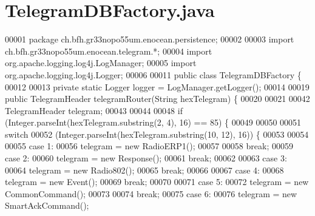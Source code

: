 \section{Telegram\+D\+B\+Factory.\+java}
\label{TelegramDBFactory_8java_source}

\begin{DoxyCode}
00001 \textcolor{keyword}{package }ch.bfh.gr33nopo55um.enocean.persistence;
00002 
00003 \textcolor{keyword}{import} ch.bfh.gr33nopo55um.enocean.telegram.*;
00004 \textcolor{keyword}{import} org.apache.logging.log4j.LogManager;
00005 \textcolor{keyword}{import} org.apache.logging.log4j.Logger;
00006 
00011 \textcolor{keyword}{public} \textcolor{keyword}{class }TelegramDBFactory \{
00012 
00013     \textcolor{keyword}{private} \textcolor{keyword}{static} Logger logger = LogManager.getLogger();
00014 
00019     \textcolor{keyword}{public} TelegramHeader telegramRouter(String hexTelegram) \{
00020 
00021 
00042         TelegramHeader telegram;
00043 
00044 
00048         \textcolor{keywordflow}{if} (Integer.parseInt(hexTelegram.substring(2, 4), 16) == 85) \{
00049 
00050 
00051             \textcolor{keywordflow}{switch}
00052                     (Integer.parseInt(hexTelegram.substring(10, 12), 16)) \{
00053 
00054 
00055                 \textcolor{keywordflow}{case} 1:
00056                     telegram = \textcolor{keyword}{new} RadioERP1();
00057 
00058                     \textcolor{keywordflow}{break};
00059                 \textcolor{keywordflow}{case} 2:
00060                     telegram = \textcolor{keyword}{new} Response();
00061                     \textcolor{keywordflow}{break};
00062 
00063                 \textcolor{keywordflow}{case} 3:
00064                     telegram = \textcolor{keyword}{new} Radio802();
00065                     \textcolor{keywordflow}{break};
00066 
00067                 \textcolor{keywordflow}{case} 4:
00068                     telegram = \textcolor{keyword}{new} Event();
00069                     \textcolor{keywordflow}{break};
00070 
00071                 \textcolor{keywordflow}{case} 5:
00072                     telegram = \textcolor{keyword}{new} CommonCommand();
00073 
00074                     \textcolor{keywordflow}{break};
00075                 \textcolor{keywordflow}{case} 6:
00076                     telegram = \textcolor{keyword}{new} SmartAckCommand();

\end{DoxyCode}

